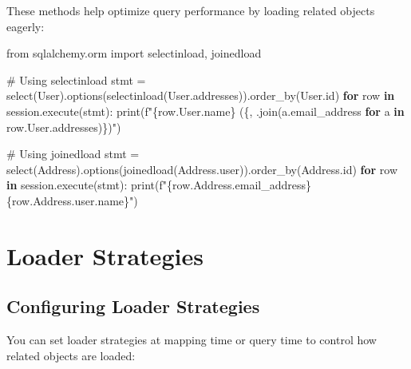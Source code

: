 \documentclass[
  letterpaper,
  DIV=11,
  numbers=noendperiod]{scrreprt}
\newenvironment{Shaded}{\begin{snugshade}}{\end{snugshade}}
\newcommand{\BuiltInTok}[1]{\textcolor[rgb]{0.00,0.23,0.31}{#1}}
\newcommand{\CommentTok}[1]{\textcolor[rgb]{0.37,0.37,0.37}{#1}}
\newcommand{\ControlFlowTok}[1]{\textcolor[rgb]{0.00,0.23,0.31}{\textbf{#1}}}
\newcommand{\ImportTok}[1]{\textcolor[rgb]{0.00,0.46,0.62}{#1}}
\newcommand{\KeywordTok}[1]{\textcolor[rgb]{0.00,0.23,0.31}{\textbf{#1}}}
\newcommand{\NormalTok}[1]{\textcolor[rgb]{0.00,0.23,0.31}{#1}}
\newcommand{\OperatorTok}[1]{\textcolor[rgb]{0.37,0.37,0.37}{#1}}
\newcommand{\SpecialCharTok}[1]{\textcolor[rgb]{0.37,0.37,0.37}{#1}}
\newcommand{\SpecialStringTok}[1]{\textcolor[rgb]{0.13,0.47,0.30}{#1}}
\newcommand{\StringTok}[1]{\textcolor[rgb]{0.13,0.47,0.30}{#1}}
\begin{document}
These methods help optimize query performance by loading related objects
eagerly:

\begin{Shaded}
\begin{Highlighting}[]
\ImportTok{from}\NormalTok{ sqlalchemy.orm }\ImportTok{import}\NormalTok{ selectinload, joinedload}

\CommentTok{\# Using selectinload}
\NormalTok{stmt }\OperatorTok{=}\NormalTok{ select(User).options(selectinload(User.addresses)).order\_by(User.}\BuiltInTok{id}\NormalTok{)}
\ControlFlowTok{for}\NormalTok{ row }\KeywordTok{in}\NormalTok{ session.execute(stmt):}
    \BuiltInTok{print}\NormalTok{(}\SpecialStringTok{f"}\SpecialCharTok{\{}\NormalTok{row}\SpecialCharTok{.}\NormalTok{User}\SpecialCharTok{.}\NormalTok{name}\SpecialCharTok{\}}\SpecialStringTok{ (}\SpecialCharTok{\{}\StringTok{\textquotesingle{}, \textquotesingle{}}\SpecialCharTok{.}\NormalTok{join(a.email\_address }\ControlFlowTok{for}\NormalTok{ a }\KeywordTok{in}\NormalTok{ row.User.addresses)}\SpecialCharTok{\}}\SpecialStringTok{)"}\NormalTok{)}

\CommentTok{\# Using joinedload}
\NormalTok{stmt }\OperatorTok{=}\NormalTok{ select(Address).options(joinedload(Address.user)).order\_by(Address.}\BuiltInTok{id}\NormalTok{)}
\ControlFlowTok{for}\NormalTok{ row }\KeywordTok{in}\NormalTok{ session.execute(stmt):}
    \BuiltInTok{print}\NormalTok{(}\SpecialStringTok{f"}\SpecialCharTok{\{}\NormalTok{row}\SpecialCharTok{.}\NormalTok{Address}\SpecialCharTok{.}\NormalTok{email\_address}\SpecialCharTok{\}}\SpecialStringTok{ }\SpecialCharTok{\{}\NormalTok{row}\SpecialCharTok{.}\NormalTok{Address}\SpecialCharTok{.}\NormalTok{user}\SpecialCharTok{.}\NormalTok{name}\SpecialCharTok{\}}\SpecialStringTok{"}\NormalTok{)}
\end{Highlighting}
\end{Shaded}

\section{Loader Strategies}\label{loader-strategies}

\subsection{Configuring Loader
Strategies}\label{configuring-loader-strategies}

You can set loader strategies at mapping time or query time to control
how related objects are loaded:
\end{document}
